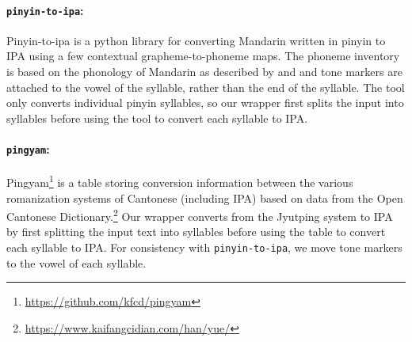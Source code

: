 \paragraph{\texttt{pinyin-to-ipa}:} Pinyin-to-ipa \citep{taubert_2024_pinyin-to-ipa_2024} is a python library for converting Mandarin written in pinyin to IPA using a few contextual grapheme-to-phoneme maps. The phoneme inventory is based on the phonology of Mandarin as described by \cite{lin2007sounds} and \cite{duanmu2007phonology} and tone markers are attached to the vowel of the syllable, rather than the end of the syllable. The tool only converts individual pinyin syllables, so our wrapper first splits the input into syllables before using the tool to convert each syllable to IPA.

\paragraph{\texttt{pingyam}:} Pingyam\footnote{\url{https://github.com/kfcd/pingyam}} is a table storing conversion information between the various romanization systems of Cantonese (including IPA) based on data from the Open Cantonese Dictionary.\footnote{\url{https://www.kaifangcidian.com/han/yue/}} Our wrapper converts from the Jyutping system to IPA by first splitting the input text into syllables before using the table to convert each syllable to IPA. For consistency with \texttt{pinyin-to-ipa}, we move tone markers to the vowel of each syllable. 


